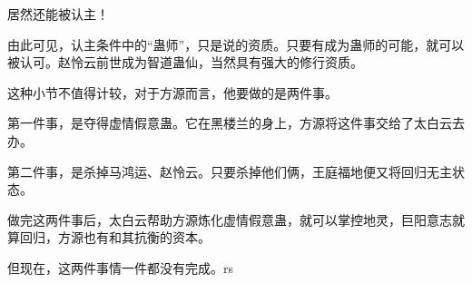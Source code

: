 \begin{this_body}
居然还能被认主！

由此可见，认主条件中的“蛊师”，只是说的资质。只要有成为蛊师的可能，就可以被认可。赵怜云前世成为智道蛊仙，当然具有强大的修行资质。

这种小节不值得计较，对于方源而言，他要做的是两件事。

第一件事，是夺得虚情假意蛊。它在黑楼兰的身上，方源将这件事交给了太白云去办。

第二件事，是杀掉马鸿运、赵怜云。只要杀掉他们俩，王庭福地便又将回归无主状态。

做完这两件事后，太白云帮助方源炼化虚情假意蛊，就可以掌控地灵，巨阳意志就算回归，方源也有和其抗衡的资本。

但现在，这两件事情一件都没有完成。rs

\end{this_body}

